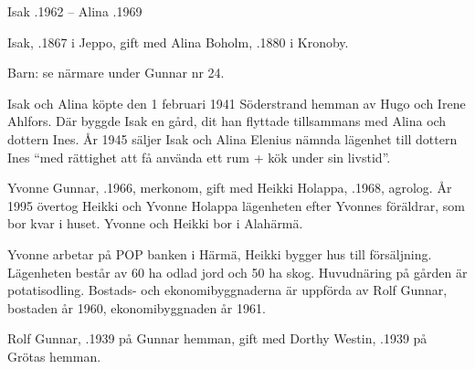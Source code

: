 Isak .1962  --  Alina .1969


Isak, .1867 i Jeppo, gift med Alina Boholm, .1880 i Kronoby.

Barn: se närmare under Gunnar nr 24.

Isak och Alina köpte den 1 februari 1941 Söderstrand hemman av Hugo och Irene Ahlfors. Där byggde Isak en gård, dit han flyttade tillsammans med Alina och dottern Ines. År 1945 säljer Isak och Alina Elenius nämnda lägenhet till dottern Ines 	``med rättighet att få använda ett rum + kök under sin livstid''.






Yvonne Gunnar, .1966, merkonom, gift med Heikki Holappa, .1968, agrolog. År 1995 övertog Heikki och Yvonne Holappa lägenheten efter Yvonnes föräldrar, som bor kvar i huset. Yvonne och Heikki bor i Alahärmä.

\begin{jhchildren}
  \item {}
  \item {}
  \item {}
  \item {}
  \item {}
\end{jhchildren}

Yvonne arbetar på POP banken i Härmä, Heikki bygger hus till försäljning. Lägenheten består av 60 ha odlad jord och 50 ha skog. Huvudnäring på gården är potatisodling. Bostads- och ekonomibyggnaderna är uppförda av Rolf Gunnar, bostaden år 1960, ekonomibyggnaden år 1961.


Rolf Gunnar, .1939 på Gunnar hemman, gift med Dorthy Westin, .1939 på Grötas hemman.

\begin{jhchildren}
  \item {}
  \item {}
\end{jhchildren}

